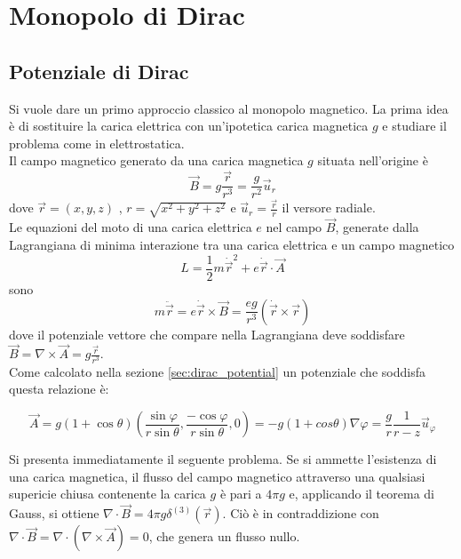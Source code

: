 \chapter{Monopolo di Dirac}\label{cap:diracmonopole}
\section{Potenziale di Dirac}
Si vuole dare un primo approccio classico al monopolo magnetico.
La prima idea è di sostituire la carica elettrica con un'ipotetica carica magnetica
$g$ e studiare il problema come in elettrostatica.\\
Il campo magnetico generato da una carica magnetica $g$ situata nell'origine è
%
\begin{equation}\label{eq:monopolefield}
  \vec B = g \frac{\vec r}{r^3} = \frac{g}{r^2} \vec u _r
\end{equation}
%
dove $\vec r = (x,y,z)$ , $r = \sqrt{x^2 + y^2 + z^2}$ e $\vec u _r = \frac{\vec r}{r}$
il versore radiale.\\
Le equazioni del moto di una carica elettrica $e$ nel campo $\vec B$,
generate dalla Lagrangiana di minima interazione tra una carica elettrica e un campo
magnetico
%
$$
   L = \frac{1}{2} m \dot{\vec r} ^2 + e \dot{\vec r} \cdot \vec A
$$
%
sono
%
$$
   m \ddot{\vec r} = e\dot{\vec r} \times \vec B =
      \frac{eg}{r^3}(\dot{\vec r} \times \vec r)
$$
%
dove il potenziale vettore che compare nella Lagrangiana deve soddisfare
$\vec B = \nabla \times \vec A = g \frac{\vec r}{r^3}$.\\

Come calcolato nella sezione \ref{sec:dirac_potential} un potenziale che soddisfa
questa relazione è:

\begin{equation}\label{eq:diracpotential}
  \vec A = g(1 + \cos\theta)\left( \frac{\sin\varphi}{r\sin\theta},
     \frac{-\cos\varphi}{r\sin\theta},0 \right) = - g (1+cos\theta) \nabla \varphi
     = \frac{g}{r}\frac{1}{r-z} \vec u _\varphi
\end{equation}

Si presenta immediatamente il seguente problema. Se si ammette l'esistenza di una carica
magnetica, il flusso del campo magnetico attraverso una qualsiasi supericie chiusa
contenente la carica $g$ è pari a $4\pi g$ e, applicando il teorema di Gauss,
si ottiene $\nabla \cdot \vec B = 4\pi g\delta^{(3)}(\vec r)$.
Ciò è in contraddizione con $\nabla \cdot \vec B = \nabla \cdot
(\nabla \times \vec A) = 0$, che genera un flusso nullo.

